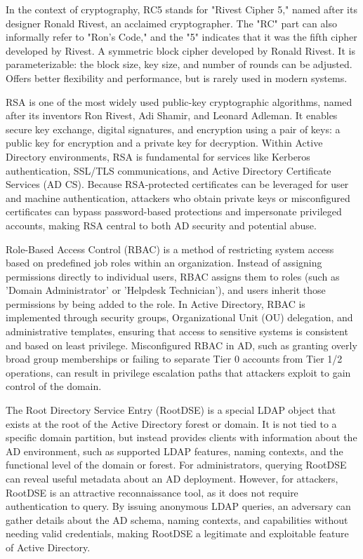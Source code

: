  In the context of cryptography, RC5 stands for "Rivest Cipher 5," named after its designer Ronald Rivest, an acclaimed cryptographer. The "RC" part can also informally refer to "Ron's Code," and the "5" indicates that it was the fifth cipher developed by Rivest. A symmetric block cipher developed by Ronald Rivest. It is parameterizable: the block size, key size, and number of rounds can be adjusted. Offers better flexibility and performance, but is rarely used in modern systems.

 RSA is one of the most widely used public-key cryptographic algorithms, named after its inventors Ron Rivest, Adi Shamir, and Leonard Adleman. It enables secure key exchange, digital signatures, and encryption using a pair of keys: a public key for encryption and a private key for decryption. Within Active Directory environments, RSA is fundamental for services like Kerberos authentication, SSL/TLS communications, and Active Directory Certificate Services (AD CS). Because RSA-protected certificates can be leveraged for user and machine authentication, attackers who obtain private keys or misconfigured certificates can bypass password-based protections and impersonate privileged accounts, making RSA central to both AD security and potential abuse.
 
 Role-Based Access Control (RBAC) is a method of restricting system access based on predefined job roles within an organization. Instead of assigning permissions directly to individual users, RBAC assigns them to roles (such as 'Domain Administrator' or 'Helpdesk Technician'), and users inherit those permissions by being added to the role. In Active Directory, RBAC is implemented through security groups, Organizational Unit (OU) delegation, and administrative templates, ensuring that access to sensitive systems is consistent and based on least privilege. Misconfigured RBAC in AD, such as granting overly broad group memberships or failing to separate Tier 0 accounts from Tier 1/2 operations, can result in privilege escalation paths that attackers exploit to gain control of the domain.

 The Root Directory Service Entry (RootDSE) is a special LDAP object that exists at the root of the Active Directory forest or domain. It is not tied to a specific domain partition, but instead provides clients with information about the AD environment, such as supported LDAP features, naming contexts, and the functional level of the domain or forest. For administrators, querying RootDSE can reveal useful metadata about an AD deployment. However, for attackers, RootDSE is an attractive reconnaissance tool, as it does not require authentication to query. By issuing anonymous LDAP queries, an adversary can gather details about the AD schema, naming contexts, and capabilities without needing valid credentials, making RootDSE a legitimate and exploitable feature of Active Directory.

